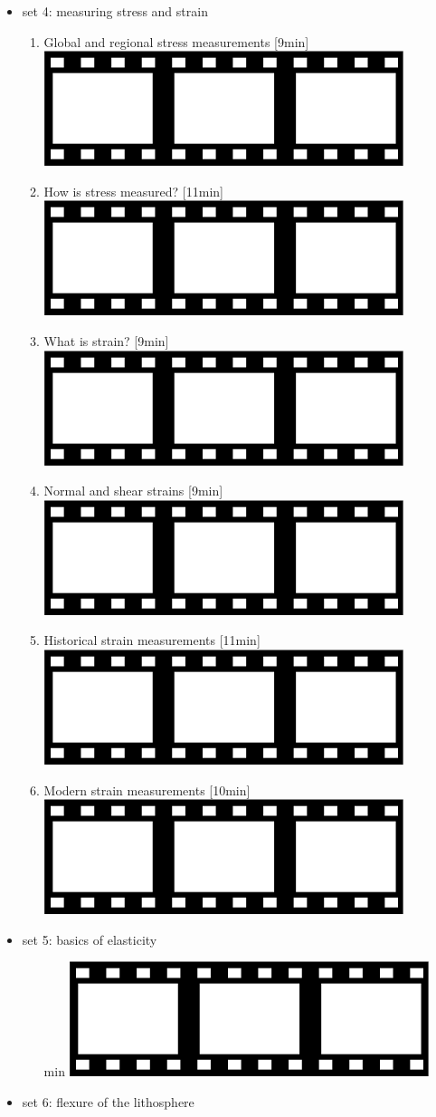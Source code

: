 \begin{itemize}
\item set 4: measuring stress and strain 
\begin{enumerate}
\item Global and regional stress measurements [9min] 
      \href{https://youtu.be/J6yu4fi4kCI?si=KlmhNOcqgycHa1cq}{\includegraphics[width=.8cm]{images/pictograms/film.png}}
\item How is stress measured? [11min] 
      \href{https://youtu.be/FtFGMryqQXI?si=2XIfjtfxgxQtsiIv}{\includegraphics[width=.8cm]{images/pictograms/film.png}}
\item What is strain? [9min] 
      \href{https://youtu.be/DQ345dy84BI?si=C1eJC_mthTaIP7z7}{\includegraphics[width=.8cm]{images/pictograms/film.png}}
\item Normal and shear strains [9min] 
      \href{https://youtu.be/CNXHtMdt-XY?si=i7JiiOyV237gVYLr}{\includegraphics[width=.8cm]{images/pictograms/film.png}}
\item Historical strain measurements [11min] 
      \href{https://youtu.be/TZXt2lk_fr4?si=cEntMD8C6-aB8-dq}{\includegraphics[width=.8cm]{images/pictograms/film.png}}
\item Modern strain measurements [10min] 
      \href{https://youtu.be/ki6X1xjnYCE?si=NJXSi2Wf38uSyMIX}{\includegraphics[width=.8cm]{images/pictograms/film.png}}
\end{enumerate}
\item set 5: basics of elasticity
\begin{enumerate}
\item [min] \href{}{\includegraphics[width=.8cm]{images/pictograms/film.png}}
\end{enumerate}
\item set 6: flexure of the lithosphere

\end{itemize}
